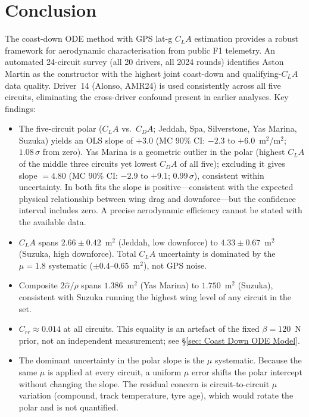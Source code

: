 \section{Conclusion}

The coast-down ODE method with GPS lat-g $C_LA$ estimation provides a robust framework for aerodynamic characterisation from public F1 telemetry. An automated 24-circuit survey (all 20 drivers, all 2024 rounds) identifies Aston Martin as the constructor with the highest joint coast-down and qualifying-$C_LA$ data quality. Driver~14 (Alonso, AMR24) is used consistently across all five circuits, eliminating the cross-driver confound present in earlier analyses. Key findings:

\begin{itemize}
    \item The five-circuit polar ($C_LA$ vs.\ $C_DA$; Jeddah, Spa, Silverstone, Yas Marina, Suzuka) yields an OLS slope of $+3.0$ (MC 90\% CI: $-2.3$ to $+6.0$~m$^2$/m$^2$; $1.08\,\sigma$ from zero). Yas Marina is a geometric outlier in the polar (highest $C_LA$ of the middle three circuits yet lowest $C_DA$ of all five); excluding it gives slope $= 4.80$ (MC 90\% CI: $-2.9$ to $+9.1$; $0.99\,\sigma$), consistent within uncertainty. In both fits the slope is positive---consistent with the expected physical relationship between wing drag and downforce---but the confidence interval includes zero. A precise aerodynamic efficiency cannot be stated with the available data.

    \item $C_LA$ spans $2.66 \pm 0.42$~m$^2$ (Jeddah, low downforce) to $4.33 \pm 0.67$~m$^2$ (Suzuka, high downforce). Total $C_LA$ uncertainty is dominated by the $\mu = 1.8$ systematic ($\pm 0.4$--$0.65$~m$^2$), not GPS noise.

    \item Composite $2\hat\alpha/\rho$ spans $1.386$~m$^2$ (Yas Marina) to $1.750$~m$^2$ (Suzuka), consistent with Suzuka running the highest wing level of any circuit in the set.

    \item $C_{rr} \approx 0.014$ at all circuits. This equality is an artefact of the fixed $\beta = 120$~N prior, not an independent measurement; see \S\ref{sec: Coast Down ODE Model}.

    \item The dominant uncertainty in the polar slope is the $\mu$ systematic. Because the same $\mu$ is applied at every circuit, a uniform $\mu$ error shifts the polar intercept without changing the slope. The residual concern is circuit-to-circuit $\mu$ variation (compound, track temperature, tyre age), which would rotate the polar and is not quantified.


\end{itemize}

